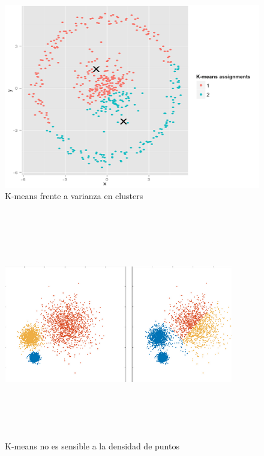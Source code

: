 \begin{figure}[ht!]
\begin{center}
\includegraphics{figuras/kmeans1.png}
\end{center}
\caption{K-means frente a varianza en clusters}
\label{fig_muestreo}
\end{figure}

\begin{figure}[ht!]
\begin{center}
\includegraphics[width=10cm,height=10cm,keepaspectratio]{figuras/kmeans2.png}
\end{center}
\caption{K-means no es sensible a la densidad de puntos}
\label{fig_kmeans2}
\end{figure}

